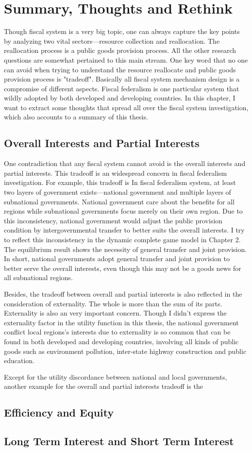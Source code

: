 \chapter{Summary, Thoughts and Rethink}

Though fiscal system is a very big topic, one can always capture the key points by analyzing two vital sectors---resource collection and reallocation. The reallocation process is a public goods provision process. All the other research questions are somewhat pertained to this main stream. One key word that no one can avoid when trying to understand the resource reallocate and public goods provision process is "tradeoff". Basically all fiscal system mechanism design is a compromise of different aspects. Fiscal federalism is one particular system that wildly adopted by both developed and developing countries. In this chapter, I want to extract some thoughts that spread all over the fiscal system investigation, which also accounts to a summary of this thesis.

\section{Overall Interests and Partial Interests}
One contradiction that any fiscal system cannot avoid is the overall interests and partial interests. This tradeoff is an widespread concern in fiscal federalism investigation. For example, this tradeoff is  In fiscal federalism system, at least two layers of government exists---national government and multiple layers of subnational governments. National government care about the benefits for all regions while subnational governments focus merely on their own region. Due to this inconsistency, national government would adjust the public provision condition by intergovernmental transfer to better suits the overall interests. I try to reflect this inconsistency in the dynamic complete  game model in Chapter 2. The equilibrium result shows the necessity of general transfer and joint provision. In short, national governments adopt general transfer and joint provision to better serve the overall interests, even though this may not be a goods news for all subnational regions.

Besides, the tradeoff between overall and partial interests is also reflected in the consideration of externality. The whole is more than the sum of its parts. Externality is also an very important concern. Though I didn't express the externality factor in the utility function in this thesis, the national government conflict local regions's interests due to externality is so common that can be found in both developed and developing countries, involving all kinds of public goods such as environment pollution, inter-state highway construction and public education\cite{1988Foreign, Branstetter2001Are, 2011Procurement}.

Except for the utility discordance between national and local governments, another example for the overall and partial interests tradeoff is the

\section{Efficiency and Equity}


\section{Long Term Interest and Short Term Interest}

